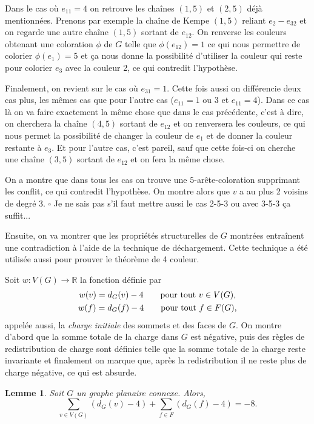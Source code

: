\documentclass[10pt,a4paper]{article}
\newtheorem{lemme}{Lemme}
\newcommand{\ep}{{\hfill $\square$}}
\begin{document}
Dans le cas où $e_{11} =4$ on retrouve les chaînes $(1,5)$ et $(2,5)$ déjà mentionnées. Prenons par exemple la chaîne de Kempe $(1,5)$ reliant $e_2 -e_{32}$ et on regarde une autre chaîne $(1,5)$ sortant de $e_{12}$. On renverse les couleurs obtenant une coloration $\phi$ de $G$ telle que $\phi(e_{12})=1$ ce qui nous permettre de colorier $\phi(e_1) = 5$ et ça nous donne la possibilité d'utiliser la couleur qui reste pour colorier $e_3$ avec la couleur 2, ce qui contredit l'hypothèse.

Finalement, on revient sur le cas où $e_{31} = 1$. Cette fois aussi on différencie deux cas plus, les mêmes cas que pour l'autre cas ($e_{11} = 1$ ou $3$ et $e_{11} = 4$). Dans ce cas là on va faire exactement la même chose que dans le cas précédente, c'est à dire, on cherchera la chaîne $(4,5)$ sortant de $e_{12}$ et on renversera les couleurs, ce qui nous permet la possibilité de changer la couleur de $e_1$ et de donner la couleur restante à $e_3$. Et pour l'autre cas, c'est pareil, sauf que cette fois-ci on cherche une chaîne $(3,5)$ sortant de $e_{12}$ et on fera la même chose. 

On a montre que dans tous les cas on trouve une $5$-arête-coloration supprimant les conflit, ce qui contredit l'hypothèse. On montre alors que $v$ a au plus 2 voisins de degré 3.
\ep
{\color{red} Je ne sais pas s'il faut mettre aussi le cas 2-5-3 ou avec 3-5-3 ça suffit...}

\bigskip
Ensuite, on va montrer que les propriétés structurelles de $G$ montrées entraînent une contradiction à l'aide de la technique de déchargement. Cette technique a été utilisée aussi pour prouver le théorème de 4 couleur. 

Soit $w: V(G) \to \mathbb{R}$  la fonction définie par
 $$
 \gathered
 w(v) = d_G(v) - 4 \qquad \textrm{pour tout $v\in V(G)$,} \\
 w(f) = d_G(f) - 4 \qquad \textrm{pour tout $f\in F(G)$,} 
\endgathered 
$$
appelée aussi, la \emph{charge initiale} des sommets et des faces de $G$. On montre d'abord que la somme totale de la charge dans $G$ est négative, puis des règles de redistribution de charge sont définies telle que la somme totale de la charge reste invariante et finalement on marque que, après la redistribution il ne reste plus de charge négative, ce qui est absurde.

\begin{lemme}
Soit $G$ un graphe planaire connexe. Alors,
$$ \sum_{v \in V(G)} (d_G(v) - 4) + \sum_{f\in F} (d_G(f) -4) = -8.$$
\end{lemme}
\end{document}
